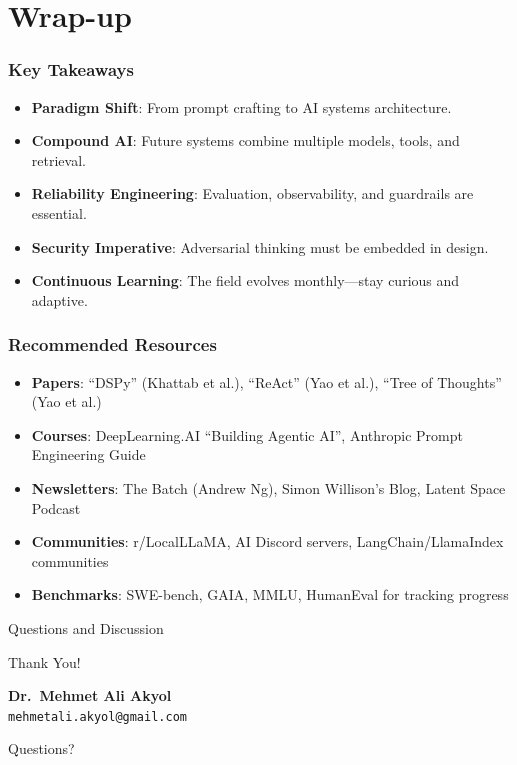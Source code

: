 \documentclass{beamer}
\begin{document}
\section{Wrap-up}

\begin{frame}
    \frametitle{Key Takeaways}
    \begin{itemize}
        \item \textbf{Paradigm Shift}: From prompt crafting to AI systems architecture.
        \item \textbf{Compound AI}: Future systems combine multiple models, tools, and retrieval.
        \item \textbf{Reliability Engineering}: Evaluation, observability, and guardrails are essential.
        \item \textbf{Security Imperative}: Adversarial thinking must be embedded in design.
        \item \textbf{Continuous Learning}: The field evolves monthly---stay curious and adaptive.
    \end{itemize}
\end{frame}

\begin{frame}
    \frametitle{Recommended Resources}
    \begin{itemize}
        \item \textbf{Papers}: ``DSPy'' (Khattab et al.), ``ReAct'' (Yao et al.), ``Tree of Thoughts'' (Yao et al.)
        \item \textbf{Courses}: DeepLearning.AI ``Building Agentic AI'', Anthropic Prompt Engineering Guide
        \item \textbf{Newsletters}: The Batch (Andrew Ng), Simon Willison's Blog, Latent Space Podcast
        \item \textbf{Communities}: r/LocalLLaMA, AI Discord servers, LangChain/LlamaIndex communities
        \item \textbf{Benchmarks}: SWE-bench, GAIA, MMLU, HumanEval for tracking progress
    \end{itemize}
\end{frame}

\begin{frame}{Questions and Discussion}
    \begin{center}
    {\Huge Thank You!}
    \vspace{1cm}

        \textbf{Dr.\ Mehmet Ali Akyol}\\
        \texttt{mehmetali.akyol@gmail.com}
    \vspace{1cm}

    {\large Questions?}
    \end{center}
\end{frame}
\end{document}
